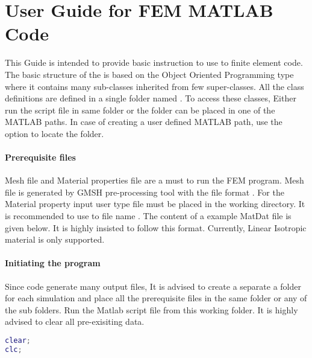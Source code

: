\documentclass[main.tex]{subfiles}
\begin{document}
\chapter{User Guide for FEM MATLAB Code}

This Guide is intended to provide basic instruction to use to  finite element code. The basic structure of the  is based on the Object Oriented Programming type where it contains many sub-classes inherited from few super-classes. All the class definitions are defined in a single folder named . To access these classes, Either run the script file in same folder or the folder can be placed in one of the MATLAB paths. In case of creating a user defined MATLAB path, use the option  to locate the  folder.

\subsubsection{Prerequisite files}
Mesh file and Material properties file are a must to run the FEM program. Mesh file is generated by GMSH pre-processing tool with the file format . For the Material property input user type file must be placed in the working directory. It is recommended to use to file name . The content of a example MatDat file is given below.  It is highly insisted to follow this format. Currently, Linear Isotropic material is only supported.



 
\subsubsection{Initiating the program}

%
Since  code generate many output files, It is advised to create a separate a folder for each simulation and place all the prerequisite  files in the same folder or any of the sub folders. Run the Matlab script file from this working folder. It is highly advised to clear all pre-exisiting data.
\begin{lstlisting}[language=matlab]
clear;
clc;
\end{lstlisting}
\end{document}

